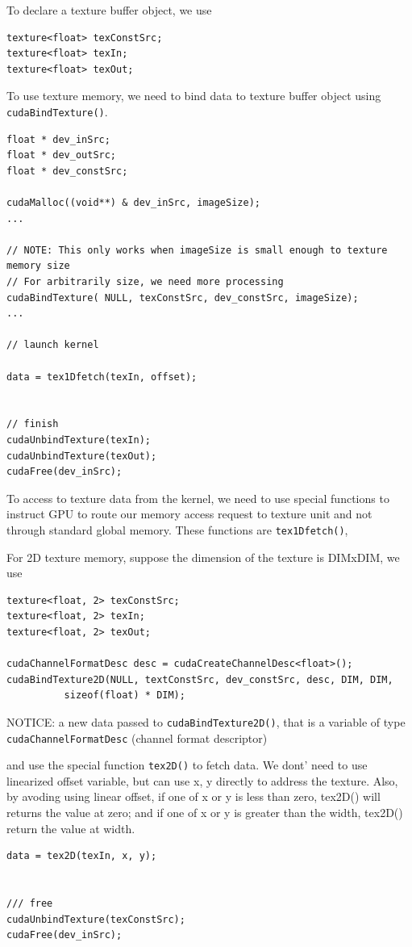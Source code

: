 To declare a texture buffer object, we use
\begin{lstlisting}
texture<float> texConstSrc;
texture<float> texIn;
texture<float> texOut;
\end{lstlisting}
To use texture memory, we need to bind data to texture buffer object using
\verb!cudaBindTexture()!. 
\begin{lstlisting}
float * dev_inSrc;
float * dev_outSrc;
float * dev_constSrc;

cudaMalloc((void**) & dev_inSrc, imageSize);
...

// NOTE: This only works when imageSize is small enough to texture memory size
// For arbitrarily size, we need more processing
cudaBindTexture( NULL, texConstSrc, dev_constSrc, imageSize);
...

// launch kernel

data = tex1Dfetch(texIn, offset);


// finish
cudaUnbindTexture(texIn);
cudaUnbindTexture(texOut);
cudaFree(dev_inSrc);
\end{lstlisting}

To access to texture data from the kernel, we need to use special functions to
instruct GPU to route our memory access request to texture unit and not through
standard global memory. These functions are \verb!tex1Dfetch()!, 

For 2D texture memory, suppose the dimension of the texture is DIMxDIM, we use
\begin{lstlisting}
texture<float, 2> texConstSrc;
texture<float, 2> texIn;
texture<float, 2> texOut;

cudaChannelFormatDesc desc = cudaCreateChannelDesc<float>();
cudaBindTexture2D(NULL, textConstSrc, dev_constSrc, desc, DIM, DIM, 
          sizeof(float) * DIM);

\end{lstlisting}
NOTICE: a new data passed to \verb!cudaBindTexture2D()!, that is a variable of
type \verb!cudaChannelFormatDesc! (channel format descriptor)

and use the special function \verb!tex2D()! to fetch data. We dont' need to use
linearized offset variable, but can use x, y directly to address the texture.
Also, by avoding using linear offset, if one of x or y is less than zero,
tex2D() will returns the value at zero; and if one of x or y is greater than the
width, tex2D() return the value at width.
\begin{lstlisting}
data = tex2D(texIn, x, y);


/// free
cudaUnbindTexture(texConstSrc);
cudaFree(dev_inSrc);
\end{lstlisting}


